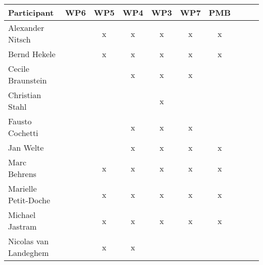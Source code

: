 \documentclass[a4paper, 11pt]{article}
\begin{document}
\begin{tabular}{|l|c|c|c||c|c|c||c|c|c|}
\hline
\textbf{Participant} & \textbf{WP6} &  \textbf{WP5} & \textbf{WP4}&  \textbf{WP3} & \textbf{WP7}&  \textbf{PMB} \\\hline
Alexander Nitsch     &   & x & x & x & x & x \\\hline  
Bernd Hekele         &   & x & x & x & x & x \\\hline
Cecile Braunstein    &   &   & x & x & x &   \\\hline
Christian Stahl      &   &   &   & x &   &   \\\hline
Fausto Cochetti      &   &   & x & x & x &   \\\hline
Jan Welte            &   &   & x & x & x & x \\\hline
Marc Behrens         &   & x & x & x & x & x \\\hline
Marielle Petit-Doche &   & x & x & x & x & x \\\hline
Michael Jastram      &   & x & x & x & x & x \\\hline
Nicolas van Landeghem&   & x & x &   &   &   \\\hline

\end{tabular}
\end{document}
